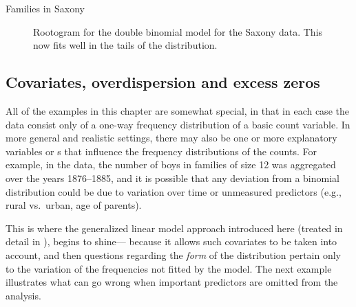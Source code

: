 \documentclass[10pt,krantz2]{krantz}\usepackage[]{graphicx}\usepackage[]{color}
\newenvironment{knitrout}{}{} %
\renewenvironment{knitrout}{\small\renewcommand{\baselinestretch}{.85}}{} %
\begin{document}
\begin{Example}[saxony2]{Families in Saxony}
\begin{knitrout}
\begin{figure}[!htbp]
\caption[Rootogram for the double binomial model for the Saxony data]{Rootogram for the double binomial model for the Saxony data. This now fits well in the tails of the distribution.\label{fig:sax-glm5}}
\end{figure}


\end{knitrout}



\end{Example}

\subsection{Covariates, overdispersion and excess zeros}
All of the examples in this chapter are somewhat special, in that in each case the
data consist only of a one-way frequency distribution of a basic count variable.
In more general and realistic settings, there may also be one or more explanatory
variables or s that influence the frequency distributions of the
counts.  For example, in the  data, the number of boys in families
of size 12 was aggregated over the years 1876--1885, and it is possible that
any deviation from a binomial distribution could be due to variation over time
or unmeasured predictors (e.g., rural vs.\ urban, age of parents).

This is where the generalized linear model
approach introduced here (treated in detail in ),
begins to shine--- because it
allows such covariates to be taken into account, and then questions regarding
the \emph{form} of the distribution pertain only to the variation of the
frequencies not fitted by the model.  The next example illustrates what
can go wrong when important predictors are omitted from the analysis.
\end{document}
